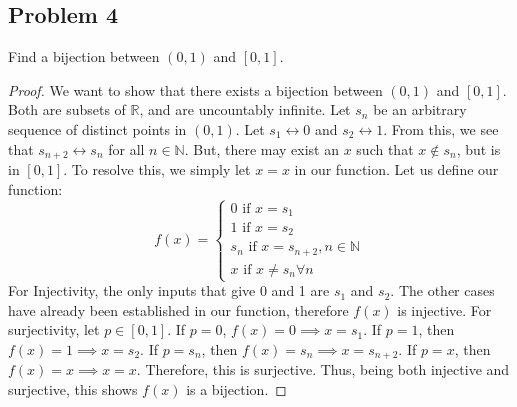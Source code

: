 \documentclass{amsart}
\begin{document}
\subsection*{Problem 4} Find a bijection between $(0,1)$ and $[0,1]$. 
\begin{proof}
    We want to show that there exists a bijection between $(0,1)$ and $[0,1]$. Both are subsets of $\mathbb{R}$, and are uncountably infinite. Let $s_n$ be an arbitrary sequence of distinct points in $(0,1)$. Let $s_1 \leftrightarrow 0$ and $s_2 \leftrightarrow 1$. From this, we see that $s_{n+2} \leftrightarrow s_n$ for all $n \in \mathbb{N}$. But, there may exist an $x$ such that $x\not\in s_n$, but is in $[0,1]$. To resolve this, we simply let $x=x$ in our function. Let us define our function: 
    \[f(x) = \begin{cases}
        0 \text{ if } x=s_1 \\ 
        1 \text{ if } x = s_2 \\ 
        s_n \text{ if } x = s_{n+2}, n \in \mathbb{N} \\ 
        x \text{ if } x \neq s_n \forall n
    \end{cases} \]
   For Injectivity, the only inputs that give 0 and 1 are $s_1$ and $s_2$. The other cases have already been established in our function, therefore $f(x)$ is injective. For surjectivity, let $p \in [0,1]$. If $p=0$, $f(x) = 0 \implies x = s_1$. If $p = 1$, then $f(x)=1 \implies x = s_2$. If $p = s_n$, then $f(x) = s_n \implies x = s_{n+2}$. If $p = x$, then $f(x) = x \implies x=x$. Therefore, this is surjective. Thus, being both injective and surjective, this shows $f(x)$ is a bijection. 
\end{proof}
\end{document}
